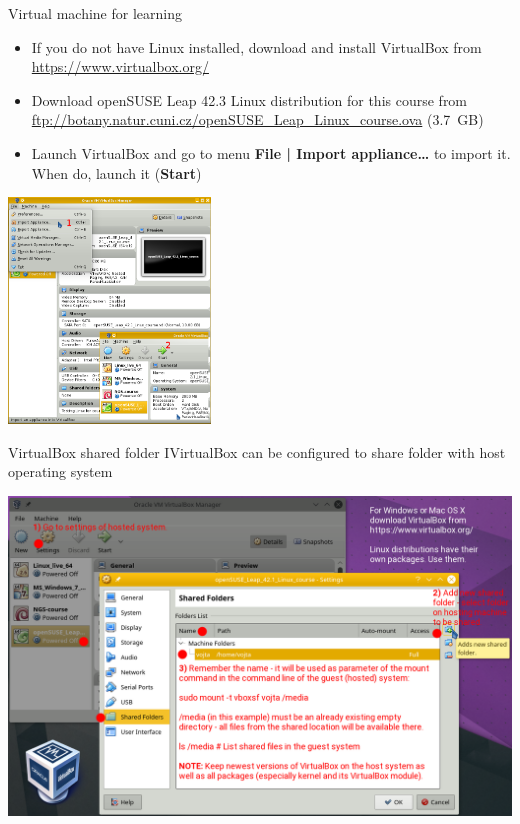 \documentclass[compress, ucs, xelatex, 11pt, xcolor=svgnames,
  hyperref={
    bookmarks=true,
    unicode=true,
    colorlinks=true,
    pdftitle={Linux, command line and MetaCentrum},
    plainpages=false,
    pdfauthor={Vojtech Zeisek},
    pdfsubject={Course about use of Linux command line, writing shell scripts and using MetaCentrum of CESNET},
    pdfcreator={XeLaTeX},
    pdfkeywords={Linux, GNU, BASH, shell, command line, MetaCentrum},
    linkcolor=DarkRed,
    anchorcolor=DarkBlue,
    citecolor=Indigo,
    filecolor=NavyBlue,
    menucolor=DarkMagenta,
    urlcolor=DarkBlue,
    pdftex},
  url={hyphens, lowtilde} %
  ]{beamer}
\begin{document}
\begin{frame}{Virtual machine for learning}
  \label{VBox}
  \begin{multicols}{2}
    \begin{itemize}
      \item If you do not have Linux installed, download and install VirtualBox from \url{https://www.virtualbox.org/}
      \item Download openSUSE Leap 42.3 Linux distribution for this course from \url{ftp://botany.natur.cuni.cz/openSUSE_Leap_Linux_course.ova} (3.7~GB)
      \item Launch VirtualBox and go to menu \textbf{File | Import appliance\ldots} to import it. When do, launch it (\textbf{Start})
    \end{itemize}
    \includegraphics[height=6cm]{virtualbox.png}
  \end{multicols}
\end{frame}


\begin{frame}{VirtualBox shared folder I}{VirtualBox can be configured to share folder with host operating system}
  \begin{center}
    \includegraphics[width=\textwidth-2cm]{virtualbox_shared_folder_1.png}
  \end{center}
\end{frame}
\end{document}
